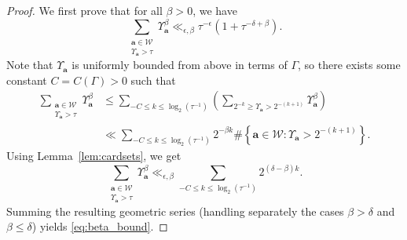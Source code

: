 \documentclass[12pt,letterpaper]{amsart}
\theoremstyle{plain}
\theoremstyle{definition}
\theoremstyle{remark}
\newcommand{\Aa}{\textbf{a}}
\begin{document}
\begin{proof}
We first prove that for all $\beta > 0$, we have
\begin{equation}\label{eq:beta_bound}
\sum_{\substack{\Aa \in \mathcal{W}\\ \Upsilon_{\Aa} > \tau}} \Upsilon_{\Aa}^\beta \ll_{\epsilon,\beta} \tau^{-\epsilon}( 1 + \tau^{-\delta+\beta} ).
\end{equation}
Note that $\Upsilon_{\Aa}$ is uniformly bounded from above in terms of $\Gamma$, so there exists some constant $C = C(\Gamma) > 0$ such that
\begin{align*}
\sum_{\substack{\Aa \in \mathcal{W}\\ \Upsilon_{\Aa} > \tau}} \Upsilon_{\Aa}^\beta 
&\le \sum_{-C \le k \le \log_2(\tau^{-1})} \left( \sum_{2^{-k} \ge \Upsilon_{\Aa} > 2^{-(k+1)}} \Upsilon_{\Aa}^\beta\right)\\ 
&\ll \sum_{-C \le k \le \log_2(\tau^{-1})} 2^{-\beta k} \#\left\{ \Aa \in \mathcal{W} : \Upsilon_{\Aa} > 2^{-(k+1)} \right\}.
\end{align*}
Using Lemma~\ref{lem:cardsets}, we get
$$
\sum_{\substack{\Aa \in \mathcal{W}\\ \Upsilon_{\Aa} > \tau}} \Upsilon_{\Aa}^\beta 
\ll_{\epsilon,\beta} \sum_{-C \le k \le \log_2(\tau^{-1})} 2^{(\delta-\beta) k}.
$$
Summing the resulting geometric series (handling separately the cases $\beta > \delta$ and $\beta \le \delta$) yields \eqref{eq:beta_bound}.


\end{proof}
\end{document}
